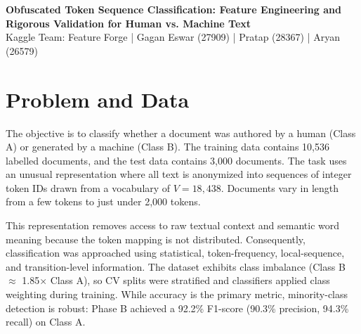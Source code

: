 \documentclass[11pt,a4paper]{article}
\begin{document}
\begin{center}
    {\Large\bfseries Obfuscated Token Sequence Classification: Feature Engineering and Rigorous Validation for Human vs. Machine Text}\\[6pt]
    {\normalsize Kaggle Team: Feature Forge | Gagan Eswar (27909) | Pratap (28367) | Aryan (26579)}\\[6pt]
\end{center}

\begin{abstract}
This project investigates text classification from obfuscated token sequences using sparse lexical, stylometric, and sequence-structural features. Lacking raw semantic information, we engineered a 150,027-feature Champion representation combining TF-IDF n-grams, stylometrics, generative Markov log-likelihoods, and Heaps' Law dynamics. After identifying data leakage in the initial cross-validation pipeline, we implemented fold-isolated multi-seed validation, establishing a project-specific empirical 94.38\% hurdle for evaluating subsequent feature additions. The final experiments yielded two final ensemble configurations, both achieving 96.06\% public leaderboard accuracy. The Phase B LightGBM + Logistic Regression ensemble using the 150,028-feature similarity-augmented Champion representation achieved 94.43\% leak-free cross-validation accuracy, while the Phase 3 ensemble of standard and shallow LightGBM models achieved 94.46\%. Thus, both configurations produced the same public leaderboard result, with only a small 0.03 percentage-point difference in cross-validation accuracy.
\end{abstract}

\section{Problem and Data}
The objective is to classify whether a document was authored by a human (Class A) or generated by a machine (Class B). The training data contains 10,536 labelled documents, and the test data contains 3,000 documents. The task uses an unusual representation where all text is anonymized into sequences of integer token IDs drawn from a vocabulary of $V = 18,438$. Documents vary in length from a few tokens to just under 2,000 tokens.

This representation removes access to raw textual context and semantic word meaning because the token mapping is not distributed. Consequently, classification was approached using statistical, token-frequency, local-sequence, and transition-level information. The dataset exhibits class imbalance (Class B $\approx$ 1.85$\times$ Class A), so CV splits were stratified and classifiers applied class weighting during training. While accuracy is the primary metric, minority-class detection is robust: Phase B achieved a 92.2\% F1-score (90.3\% precision, 94.3\% recall) on Class A.
\end{document}
